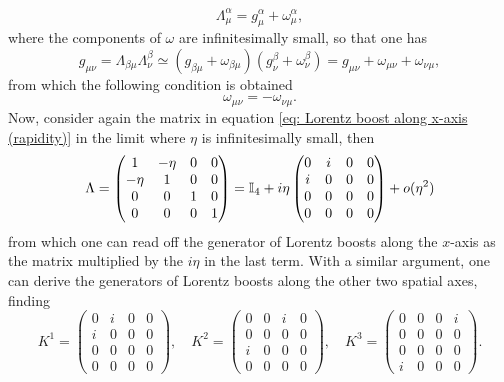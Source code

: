 \begin{equation}
    \Lambda^\alpha_\mu = g^\alpha_\mu + \omega^\alpha_\mu,
\end{equation}
where the components of $\omega$ are infinitesimally small, so that one has
\begin{equation}
    g_{\mu\nu} = \Lambda_{\beta\mu}\Lambda^\beta_\nu \simeq (g_{\beta\mu} + \omega_{\beta\mu})(g^\beta_\nu + \omega^\beta_\nu) = g_{\mu\nu} + \omega_{\mu\nu} + \omega_{\nu\mu},
\end{equation}
from which the following condition is obtained
\begin{equation}
    \omega_{\mu\nu} = - \omega_{\nu\mu}.
\end{equation}
Now, consider again the matrix in equation \eqref{eq: Lorentz boost along x-axis (rapidity)} in the limit where $\eta$ is infinitesimally small, then
\begin{equation}
    \Lambda = 
    \begin{pmatrix}
        1 & -\eta & 0 & 0 \\
        -\eta & 1 & 0 & 0 \\
        0 & 0 & 1 & 0 \\
        0 & 0 & 0 & 1 \\
    \end{pmatrix} = \mathbb{I}_4 + i\eta
    \begin{pmatrix}
        0 & i & 0 & 0 \\
        i & 0 & 0 & 0 \\
        0 & 0 & 0 & 0 \\
        0 & 0 & 0 & 0 \\
    \end{pmatrix} + o(\eta^2)
\end{equation}
from which one can read off the generator of Lorentz boosts along the $x$-axis as the matrix multiplied by the $i\eta$ in the last term. With a similar argument, one can derive the generators of Lorentz boosts along the other two spatial axes, finding 
\begin{equation}
    K^1 = 
    \begin{pmatrix}
        0 & i & 0 & 0 \\
        i & 0 & 0 & 0 \\
        0 & 0 & 0 & 0 \\
        0 & 0 & 0 & 0
    \end{pmatrix},\quad
    K^2 = 
    \begin{pmatrix}
        0 & 0 & i & 0 \\
        0 & 0 & 0 & 0 \\
        i & 0 & 0 & 0 \\
        0 & 0 & 0 & 0
    \end{pmatrix},\quad
    K^3 = 
    \begin{pmatrix}
        0 & 0 & 0 & i \\
        0 & 0 & 0 & 0 \\
        0 & 0 & 0 & 0 \\
        i & 0 & 0 & 0
    \end{pmatrix}.
\end{equation}
